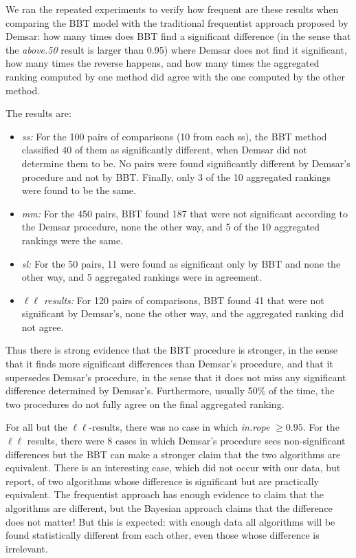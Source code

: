 \documentclass[twoside,11pt,preprint]{article}
\begin{document}
We ran the repeated experiments to verify how frequent are these results when comparing the BBT model with the traditional frequentist approach proposed by Demsar: how many times does BBT find a significant difference (in the sense that the {\em above.50} result is larger than 0.95) where Demsar does not find it significant, how many times the reverse happens, and how many times the aggregated ranking computed by one method did agree with the one computed by the other method.

The results are:

\begin{itemize}
\item
  \emph{ss:} For the 100 pairs of comparisons (10 from each ss), the BBT
  method classified 40 of them as significantly different, when
  Demsar did not determine them to be. No pairs were found
  significantly different by Demsar's procedure and not by BBT. Finally,
  only 3 of the 10 aggregated rankings were found to be the same.
\item
  \emph{mm:} For the 450 pairs, BBT found 187 that were not significant
  according to the Demsar procedure, none the other way, and 5 of
  the 10 aggregated rankings were the same.
\item
  \emph{sl:} For the 50 pairs, 11 were found as significant only by BBT
  and none the other way, and 5 aggregated rankings were in
  agreement.
\item
  \emph{$\ell\ell$ results:} For 120 pairs of comparisons, BBT found 41 that were
  not significant by Demsar's, none the other way, and the
  aggregated ranking did not agree.
\end{itemize}

Thus there is strong evidence that the BBT procedure is stronger, in
the sense that it finds more significant differences than Demsar's
procedure, and that it supersedes Demsar's procedure, in the sense
that it does not miss any significant difference determined by
Demsar's. Furthermore, usually 50\% of the time, the two procedures do
not fully agree on the final aggregated ranking.

For all but the $\ell\ell$-results, there was no case in which {\em in.rope}
\(\ge 0.95\). For the $\ell\ell$ results, there were 8 cases in which
Demsar's procedure sees non-significant differences but the BBT can
make a stronger claim that the two algorithms are equivalent. There is
an interesting case, which did not occur with our data, but
\citet{benavoli2017time} report, of two algorithms whose difference is
significant but are practically equivalent. The frequentist approach
has enough evidence to claim that the algorithms are different, but
the Bayesian approach claims that the difference does not matter! But
this is expected: with enough data all algorithms will be found
statistically different from each other, even those whose difference
is irrelevant.
\end{document}
